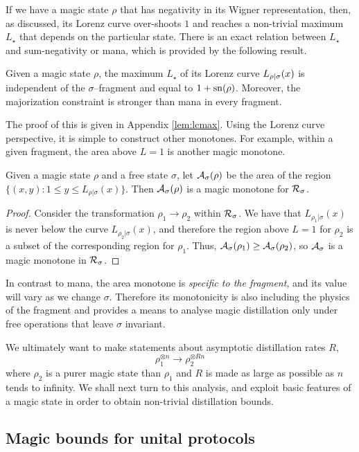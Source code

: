 \documentclass[pra,
aps,
twocolumn,
superscriptaddress,
groupedaddress,
nofootinbib,
reprint
]{revtex4-1}
\begin{document}
If we have a magic state $\rho$ that has negativity in its Wigner representation, then, as discussed, its Lorenz curve over-shoots $1$ and reaches a non-trivial maximum $L_\star$ that depends on the particular state. There is an exact relation between $L_\star$ and sum-negativity or mana, which is provided by the following result. 
\begin{lemma}\label{lem:lcmax}
	Given a magic state $\rho$, the maximum $L_\star$ of its Lorenz curve ${L_{\rho|\sigma}}(x)$ is independent of the $\sigma$--fragment and equal to $1+{{\rm{sn}}(\rho)}$. Moreover, the majorization constraint is stronger than mana in every fragment.
\end{lemma}
The proof of this is given in Appendix \ref{lem:lcmax}. Using the Lorenz curve perspective, it is simple to construct other monotones. For example, within a given fragment, the area above $L=1$ is another magic monotone.
\begin{lemma}
Given a magic state $\rho$ and a free state $\sigma$, let ${\mathcal A}_\sigma(\rho)$ be the area of the region $\{(x, y): 1 \leq y \leq L_{\rho | \sigma}(x)\}$. Then ${\mathcal A}_\sigma(\rho)$ is a magic monotone for ${\mathcal R}_\sigma$.
\end{lemma}
\begin{proof}
Consider the transformation $\rho_1 \rightarrow \rho_2$ within ${\mathcal R}_\sigma$. We have that $L_{\rho_1|\sigma}(x)$ is never below the curve $L_{\rho_2|\sigma}(x)$, and therefore the region above $L=1$ for $\rho_2$ is a subset of the corresponding region for $\rho_1$. Thus, ${\mathcal A}_\sigma(\rho_1) \geq {\mathcal A}_\sigma(\rho_2)$, so ${\mathcal A}_\sigma$ is a magic monotone in ${\mathcal R}_\sigma$.
\end{proof}
In contrast to mana, the area monotone is \emph{specific to the fragment}, and its value will vary as we change $\sigma$. Therefore its monotonicity is also including the physics of the fragment and provides a means to analyse magic distillation only under free operations that leave $\sigma$ invariant.

We ultimately want to make statements about asymptotic distillation rates $R$,
\begin{equation}
\rho_1^{\otimes n} \longrightarrow \rho_2^{\otimes R n}
\end{equation}
where $\rho_2$ is a purer magic state than $\rho_1$ and $R$ is made as large as possible as $n$ tends to infinity. We shall next turn to this analysis, and exploit basic features of a magic state in order to obtain non-trivial distillation bounds.

\subsection{Magic bounds for unital protocols}
\label{sec:unital}
\end{document}
